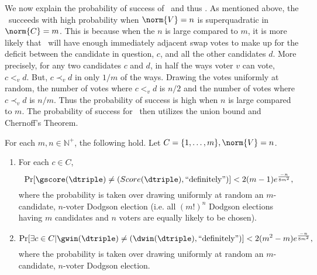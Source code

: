 We now explain the probability of success of \gscore~and thus \gwin.
As mentioned above, the \gwin~succeeds with high probability when
$\norm{V} = n$ is superquadratic in $\norm{C} = m$.
This is because when the $n$ is large compared to $m$,
it is more likely that \gscore~will have enough immediately adjacent swap votes
to make up for the deficit between the candidate in question, $c$, and all
the other candidates $d$.
More precisely, for any two candidates $c$ and $d$, in half the ways voter
$v$ can vote, $c <_v d$.
But, $c \prec_v d$ in only $1/m$ of the ways.
Drawing the votes uniformly at random, the number of votes where $c <_v d$ is
$n/2$ and the number of votes where $c \prec_v d$  is $n/m$.
Thus the probability of success is high when $n$ is large compared to $m$.
The probability of success for \gwin~then utilizes the union bound and Chernoff's
Theorem.

\newpage
\begin{theorem}
	For each $m,n \in \mathbb{N}^+$, the following hold.
	Let $C = \{1, \dots, m\}, \norm{V} = n$.
	\begin{enumerate}
		\item For each $c \in C$,
		\[\Pr[\gscore(\dtriple) \neq
		(Score(\dtriple), \text{``definitely''})] < 2(m-1)
		e^{\frac{-n}{8m^2}},\]
		where the probability is taken over
		drawing uniformly at random an $m$-candidate, $n$-voter
		Dodgson election (i.e. all $(m!)^n$ Dodgson elections having
		$m$ candidates and $n$ voters are equally likely to be chosen).
		\item \[\Pr[ \exists c \in C | \gwin(\dtriple) \neq
		(\dwin(\dtriple), \text{``definitely''})] <
		2(m^2-m) e^{\frac{-n}{8m^2}},\]
		where the probability is taken over
		drawing uniformly at random an $m$-candidate, $n$-voter
		Dodgson election.
	\end{enumerate}
\end{theorem}

